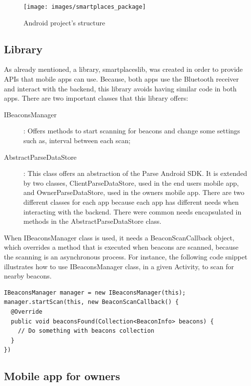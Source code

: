 \begin{figure}[!ht]
  \centering
    \texttt{[image: images/smartplaces\_package]}
    \caption{Android project's structure}
    \label{fig:smartplaces_package}
\end{figure}

\subsection{Library}
\label{sub:library}
As already mentioned, a library, smartplaceslib, was created in order to provide \glspl{API} that mobile apps can
use. Because, both apps use the Bluetooth receiver and interact with the backend, this library avoids having similar code in both apps. There are two important classes that this library offers:
\begin{description}
  \item[IBeaconsManager]: Offers methods to start scanning for beacons and change some settings such as, interval between each scan;
  \item[AbstractParseDataStore]: This class offers an abstraction of the Parse Android \gls{SDK}. It is extended by two classes, ClientParseDataStore, used in the end users mobile app, and OwnerParseDataStore, used in the owners mobile app. There are two different classes for each app because each app has different needs when interacting with the backend. There were common needs encapsulated in methods in the AbstractParseDataStore class.
\end{description}

When IBeaconsManager class is used, it needs a BeaconScanCallback object, which overrides a method that is executed when beacons are scanned, because the scanning is an asynchronous process.
For instance, the following code snippet illustrates how to use IBeaconsManager class, in a given Activity, to scan for nearby beacons.

\begin{lstlisting}
IBeaconsManager manager = new IBeaconsManager(this);
manager.startScan(this, new BeaconScanCallback() {
  @Override
  public void beaconsFound(Collection<BeaconInfo> beacons) {
    // Do something with beacons collection
  }
})
\end{lstlisting}

\subsection{Mobile app for owners}
\label{sub:mobile_app_for_owners}

